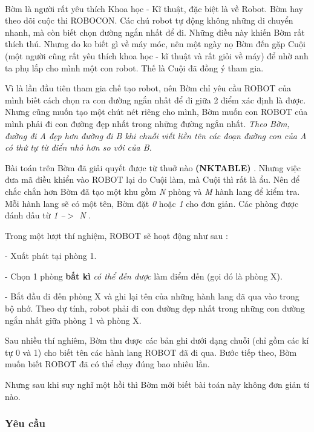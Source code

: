 

 

Bờm là người rất yêu thích Khoa học - Kĩ thuật, đặc biệt là về Robot. Bờm hay theo dõi cuộc thi ROBOCON. Các chú robot tự động không những di chuyển nhanh, mà còn biết chọn đường ngắn nhất để đi. Những điều này khiến Bờm rất thích thú. Nhưng do ko biết gì về máy móc, nên một ngày nọ Bờm đến gặp Cuội (một người cũng rất yêu thích khoa học - kĩ thuật và rất giỏi về máy) để nhờ anh ta phụ lắp cho mình một con robot. Thế là Cuội đã đồng ý tham gia.

Vì là lần đầu tiên tham gia chế tạo robot, nên Bờm chỉ yêu cầu ROBOT của mình biết cách chọn ra con đường ngắn nhất để đi giữa 2 điểm xác định là được. Nhưng cũng muốn tạo một chút nét riêng cho mình, Bờm muốn con ROBOT của mình phải đi con đường đẹp nhất trong những đường ngắn nhất. \emph{ Theo Bờm, đường đi A đẹp hơn đường đi B khi chuỗi viết liền tên các đoạn đường con của A có thứ tự từ điển nhỏ hơn so với của B. }

Bài toán trên Bờm đã giải quyết được từ thuở nào \textbf{ (NKTABLE) } . Nhưng việc đưa mã điều khiển vào ROBOT lại do Cuội làm, mà Cuội thì rất là ẩu. Nên để chắc chắn hơn Bờm đã tạo một khu gồm \emph{ N } phòng và \emph{ M } hành lang để kiểm tra. Mỗi hành lang sẽ có một tên, Bờm đặt \emph{ 0 } hoặc \emph{ 1 } cho đơn giản. Các phòng được đánh dấu từ \emph{ 1 --$>$ N } .

Trong một lượt thí nghiệm, ROBOT sẽ hoạt động như sau :

- Xuất phát tại phòng 1.

- Chọn 1 phòng \textbf{ bất kì }\emph{ có thể đến được } làm điểm đến (gọi đó là phòng X).

- Bắt đầu đi đến phòng X và ghi lại tên của những hành lang đã qua vào trong bộ nhớ. Theo dự tính, robot phải đi con đường đẹp nhất trong những con đường ngắn nhất giữa phòng 1 và phòng X.

Sau nhiều thí nghiêm, Bờm thu được các bản ghi dưới dạng chuỗi (chỉ gồm các kí tự 0 và 1) cho biết tên các hành lang ROBOT đã đi qua. Bước tiếp theo, Bờm muốn biết ROBOT đã có thể chạy đúng bao nhiêu lần.

Nhưng sau khi suy nghĩ một hồi thì Bờm mới biết bài toán này không đơn giản tí nào.

\subsubsection{\textbf{Yêu cầu }}

